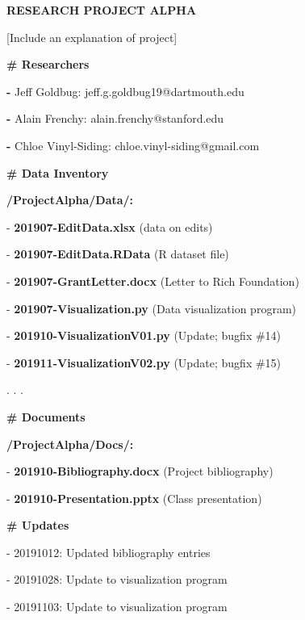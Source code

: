 \begin{center}
\begin{tcolorbox}[colframe=oyster, coltitle=black, sharp corners, title=README.md]

\textbf{RESEARCH PROJECT ALPHA}

\medskip

[Include an explanation of project]

\medskip

\textbf{\# Researchers}

\textbf{-} Jeff Goldbug: {\color{green}jeff.g.goldbug19@dartmouth.edu}

\textbf{-} Alain Frenchy: {\color{green}alain.frenchy@stanford.edu}

\textbf{-} Chloe Vinyl-Siding: {\color{green}chloe.vinyl-siding@gmail.com}

\medskip

\textbf{\# Data Inventory}

\smallskip

{\color{green}\textbf{/ProjectAlpha/Data/:}}

- \textbf{201907-EditData.xlsx} (data on edits)

- \textbf{201907-EditData.RData} (R dataset file)

- \textbf{201907-GrantLetter.docx} (Letter to Rich Foundation)

- \textbf{201907-Visualization.py} (Data visualization program)

- \textbf{201910-VisualizationV01.py} (Update; bugfix \#14)

- \textbf{201911-VisualizationV02.py} (Update; bugfix \#15)

. . . \medskip

\textbf{\# Documents}

{\color{green}\textbf{/ProjectAlpha/Docs/:}}

- \textbf{201910-Bibliography.docx} (Project bibliography)

- \textbf{201910-Presentation.pptx} (Class presentation)

\medskip

\textbf{\# Updates}

- 20191012: Updated bibliography entries

- 20191028: Update to visualization program

- 20191103: Update to visualization program

\end{tcolorbox}

\end{center}

